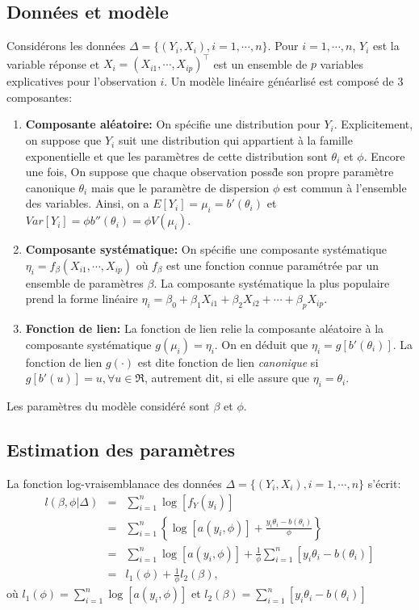\documentclass[11pt]{article}
\begin{document}
\subsection{Donn\'ees et mod\`ele}
Consid\'erons les donn\'ees $\Delta=\{(Y_i,X_i), i=1,\cdots,n\}$. Pour $i=1,\cdots,n$, $Y_i$ est la variable r\'eponse et $X_i=(X_{i1},\cdots,X_{ip})^\top$ est un ensemble de $p$ variables explicatives pour l'observation $i$. Un mod\`ele lin\'eaire g\'en\'earlis\'e est compos\'e de 3 composantes:
\begin{enumerate}
\item[$\bullet$] {\bf Composante al\'eatoire:} On sp\'ecifie une distribution pour $Y_i$. Explicitement, on suppose que $Y_i$ suit une distribution qui appartient \`a la famille exponentielle et que les param\`etres de cette distribution sont $\theta_i$ et $\phi$. Encore une fois, On suppose que chaque observation poss\`de son propre param\`etre canonique $\theta_i$ mais que le param\`etre de dispersion $\phi$ est commun \`a l'ensemble des variables. Ainsi, on a $E[Y_i]=\mu_i=b'(\theta_i)$ et $Var[Y_i]=\phi b''(\theta_i) = \phi V(\mu_i)$.
\item[$\bullet$] {\bf Composante syst\'ematique:} On sp\'ecifie une composante syst\'ematique $\eta_i=f_\beta(X_{i1},\cdots,X_{ip})$  o\`u $f_\beta$ est une fonction connue param\'etr\'ee par un ensemble de param\`etres $\beta$. La composante syst\'ematique la plus populaire prend la forme lin\'eaire $\eta_i=\beta_0+\beta_1 X_{i1}+\beta_2 X_{i2} + \cdots + \beta_p X_{ip}$.
\item[$\bullet$] {\bf Fonction de lien:} La fonction de lien relie la composante al\'eatoire \`a la composante syst\'ematique $g(\mu_i)=\eta_i$. On en d\'eduit que $\eta_i=g[b'(\theta_i)]$. La fonction de lien $g(\cdot)$ est dite fonction de lien {\it canonique} si $g[b'(u)]=u, \forall u \in \Re$, autrement dit, si elle assure que $\eta_i=\theta_i$.
\end{enumerate}
\noindent Les param\`etres du mod\`ele consid\'er\'e sont $\beta$ et $\phi$.

\subsection{Estimation des param\`etres}

\noindent La fonction log-vraisemblanace des donn\'ees $\Delta=\{(Y_i,X_i), i=1,\cdots,n\}$ s'\'ecrit:
\begin{eqnarray*}
l(\beta,\phi|\Delta) &=& \sum_{i=1}^n \log\left[f_Y(y_i)\right] \\
&=& \sum_{i=1}^n \left\{ \log\left[a(y_i,\phi)\right] + \frac{y_i\theta_i-b(\theta_i)}{\phi} \right\}  \\
&=& \sum_{i=1}^n \log\left[a(y_i,\phi)\right] + \frac{1}{\phi} \sum_{i=1}^n \left[y_i\theta_i-b(\theta_i)\right] \\
&=& l_1(\phi) + \frac{1}{\phi} l_2(\beta),
\end{eqnarray*}
\noindent o\`u $l_1(\phi)=\sum_{i=1}^n \log\left[a(y_i,\phi)\right]$ et $l_2(\beta)=\sum_{i=1}^n \left[y_i\theta_i-b(\theta_i)\right]$
\end{document}
